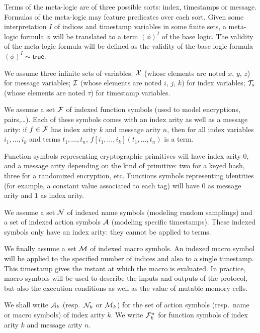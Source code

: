Terms of the meta-logic are of three possible sorts: index, timestamps
or message. Formulas of the meta-logic may feature predicates over each sort.
Given some interpretation $I$ of indices and timestamp variables in some finite
sets, a meta-logic formula $\phi$ will be translated to a term $(\phi)^I$
of the base logic.
The validity of the meta-logic formula will be defined as the validity of the
base logic formula $(\phi)^I \sim \mathsf{true}$.

\medskip

We assume three infinite sets of variables:
$\mathcal{X}$ (whose elements are noted $x$, $y$, $z$) for message variables;
$\mathcal{I}$ (whose elements are noted $i$, $j$, $k$) for index variables;
${\mathcal{T}_s}$ (whose elements are noted $\tau$) for timestamp variables.

We assume a set $\mathcal{F}$ of indexed function symbols
(used to model encryptions, pairs,\dots).
Each of these symbols comes with an index arity as well as a message arity:
if $f\in\mathcal{F}$ has index arity $k$ and message arity $n$,
then for all index variables $i_1,\ldots,i_k$ and terms $t_1,\ldots,t_n$,
$f[i_1,\ldots,i_k](t_1,\ldots,t_n)$ is a term.

\begin{example}
  Function symbols representing cryptographic primitives will have index
  arity $0$, and a message arity depending on the kind of primitive:
  two for a keyed hash, three for a randomized encryption, etc.
  Functions symbols representing identities (for example, a constant value
  associated to each tag) will have $0$ as message arity and $1$ as index arity.
\end{example}

We assume a set $\mathcal{N}$ of indexed name symbols
(modeling random samplings)
and a set of indexed action symbols $\mathcal{A}$
(modeling specific timestamps).
These indexed symbols only have an index arity: they
cannot be applied to terms.

We finally assume a set $\mathcal{M}$ of indexed macro symbols.
An indexed macro symbol will be applied to the specified number of
indices and also to a single timestamp.
This timestamp gives the instant at which the macro is evaluated.
In practice, macro symbols will be used to describe the inputs and outputs
of the protocol, but also the execution conditions as well as the value of
mutable memory cells.

We shall write $\mathcal{A}_k$ (resp.\ $\mathcal{N}_k$ or $\mathcal{M}_k$) for the set of action
symbols (resp.\ name or macro symbols) of index arity $k$.
We write $\mathcal{F}_k^n$ for function symbols of index arity $k$ and message
arity $n$.

